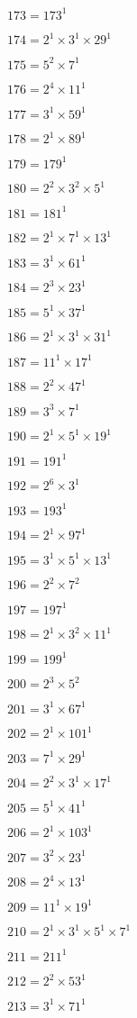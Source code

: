 $173 = 173^{1}$

$174 = 2^{1} × 3^{1} × 29^{1}$

$175 = 5^{2} × 7^{1}$

$176 = 2^{4} × 11^{1}$

$177 = 3^{1} × 59^{1}$

$178 = 2^{1} × 89^{1}$

$179 = 179^{1}$

$180 = 2^{2} × 3^{2} × 5^{1}$

$181 = 181^{1}$

$182 = 2^{1} × 7^{1} × 13^{1}$

$183 = 3^{1} × 61^{1}$

$184 = 2^{3} × 23^{1}$

$185 = 5^{1} × 37^{1}$

$186 = 2^{1} × 3^{1} × 31^{1}$

$187 = 11^{1} × 17^{1}$

$188 = 2^{2} × 47^{1}$

$189 = 3^{3} × 7^{1}$

$190 = 2^{1} × 5^{1} × 19^{1}$

$191 = 191^{1}$

$192 = 2^{6} × 3^{1}$

$193 = 193^{1}$

$194 = 2^{1} × 97^{1}$

$195 = 3^{1} × 5^{1} × 13^{1}$

$196 = 2^{2} × 7^{2}$

$197 = 197^{1}$

$198 = 2^{1} × 3^{2} × 11^{1}$

$199 = 199^{1}$

$200 = 2^{3} × 5^{2}$

$201 = 3^{1} × 67^{1}$

$202 = 2^{1} × 101^{1}$

$203 = 7^{1} × 29^{1}$

$204 = 2^{2} × 3^{1} × 17^{1}$

$205 = 5^{1} × 41^{1}$

$206 = 2^{1} × 103^{1}$

$207 = 3^{2} × 23^{1}$

$208 = 2^{4} × 13^{1}$

$209 = 11^{1} × 19^{1}$

$210 = 2^{1} × 3^{1} × 5^{1} × 7^{1}$

$211 = 211^{1}$

$212 = 2^{2} × 53^{1}$

$213 = 3^{1} × 71^{1}$

